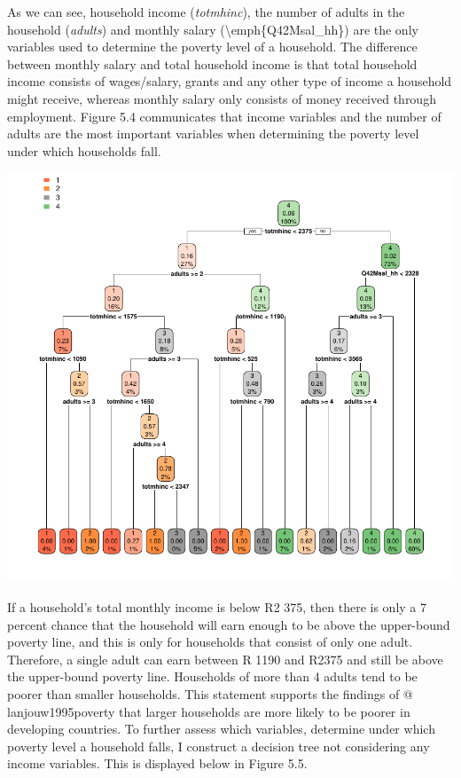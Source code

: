 \documentclass[11pt,preprint, authoryear]{elsarticle}
\let\origfigure\figure
\let\endorigfigure\endfigure
\renewenvironment{figure}[1][2] {
    \expandafter\origfigure\expandafter[H]
} {
    \endorigfigure
}
\numberwithin{equation}{section}
\numberwithin{figure}{section}
\numberwithin{table}{section}
\begin{document}
As we can see, household income (\emph{totmhinc}), the number of adults
in the household (\emph{adults}) and monthly salary
(\textbackslash emph\{Q42Msal\_hh\}) are the only variables used to
determine the poverty level of a household. The difference between
monthly salary and total household income is that total household income
consists of wages/salary, grants and any other type of income a
household might receive, whereas monthly salary only consists of money
received through employment. Figure 5.4 communicates that income
variables and the number of adults are the most important variables when
determining the poverty level under which households fall.

\begin{figure}[H]

{\centering \includegraphics{Predicting-Poverty_files/figure-latex/Figure7-1} 

}

\caption{Decision Tree\label{Figure7}}\label{fig:Figure7}
\end{figure}

If a household's total monthly income is below R2 375, then there is
only a 7 percent chance that the household will earn enough to be above
the upper-bound poverty line, and this is only for households that
consist of only one adult. Therefore, a single adult can earn between R
1190 and R2375 and still be above the upper-bound poverty line.
Households of more than 4 adults tend to be poorer than smaller
households. This statement supports the findings of @ lanjouw1995poverty
that larger households are more likely to be poorer in developing
countries. To further assess which variables, determine under which
poverty level a household falls, I construct a decision tree not
considering any income variables. This is displayed below in Figure 5.5.
\end{document}
